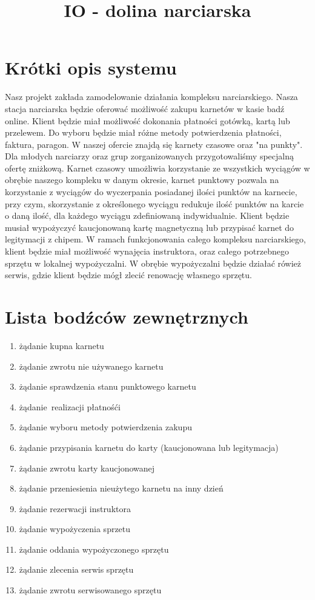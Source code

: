 \documentclass{sprawozdanie-agh}
\title{IO - dolina narciarska}
\begin{document}

\stronatytulowa{}

\section{Krótki opis systemu}
    \large
    Nasz projekt zakłada zamodelowanie działania kompleksu narciarskiego. Nasza stacja narciarska będzie oferować możliwość zakupu karnetów w kasie badź online. Klient będzie miał możliwość dokonania płatności gotówką, kartą lub przelewem. Do wyboru będzie miał różne metody potwierdzenia płatności, faktura, paragon. W naszej ofercie znajdą się karnety czasowe oraz "na punkty". Dla młodych narciarzy oraz grup zorganizowanych przygotowaliśmy specjalną ofertę zniżkową. Karnet czasowy umożliwia korzystanie ze wszystkich wyciągów w obrębie naszego kompleku w danym okresie, karnet punktowy pozwala na korzystanie z wyciągów do wyczerpania posiadanej ilości punktów na karnecie, przy czym, skorzystanie z określonego wyciągu redukuje ilość punktów na karcie o daną ilość, dla każdego wyciągu zdefiniowaną indywidualnie. Klient będzie musiał wypożyczyć kaucjonowaną kartę magnetyczną lub przypisać karnet do legitymacji z chipem. W ramach funkcjonowania całego kompleksu narciarskiego, klient będzie miał możliwość wynajęcia instruktora, oraz całego potrzebnego sprzętu w lokalnej wypożyczalni. W obrębie wypożyczalni będzie działać rówież serwis, gdzie klient będzie mógł zlecić renowację własnego sprzętu.

\section{Lista bodźców zewnętrznych}
    \begin{enumerate}
	\item żądanie kupna karnetu
        \item żądanie zwrotu nie używanego karnetu
        \item żądanie sprawdzenia stanu punktowego karnetu
        \item żądanie realizacji płatnośći
	\item żądanie wyboru metody potwierdzenia zakupu
	\item żądanie przypisania karnetu do karty (kaucjonowana lub legitymacja)
	\item żądanie zwrotu karty kaucjonowanej
	\item żądanie przeniesienia nieużytego karnetu na inny dzień
	\item żądanie rezerwacji instruktora
        \item żądanie wypożyczenia sprzetu
	\item żądanie oddania wypożyczonego sprzętu
	\item żądanie zlecenia serwis sprzętu
	\item żądanie zwrotu serwisowanego sprzętu
    \end{enumerate}
\end{document}
